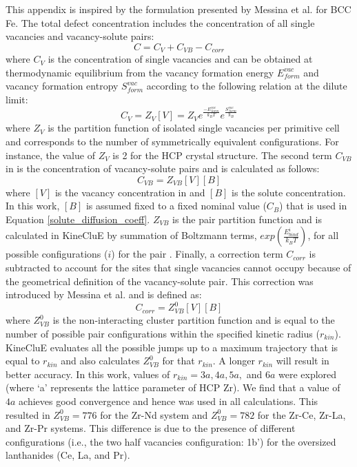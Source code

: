 \documentclass[preprint,12pt]{elsarticle}
\begin{document}
This appendix is inspired by the formulation presented by Messina et al. \cite{messina_solute_2020} for BCC Fe. The total defect concentration includes the concentration of all single vacancies and vacancy-solute pairs:
\begin{equation}
\label{eq_tot_conc}
    C = C_V + C_{VB} - C_{corr}
\end{equation}
where $C_V$ is the concentration of single vacancies and can be obtained at thermodynamic equilibrium from the vacancy formation energy $E_{form}^{vac}$ and vacancy formation entropy $S_{form}^{vac}$ according to the following relation at the dilute limit:
\begin{equation}
\label{eq_vac_conc}
    C_V = Z_V [V] = Z_V e^{\frac{-E_{form}^{vac}}{k_B T}} e^{\frac{S_{form}^{vac}}{k_B}}
\end{equation}
where $Z_V$ is the partition function of isolated single vacancies per primitive cell and corresponds to the number of symmetrically equivalent configurations. For instance, the value of $Z_V$ is 2 for the HCP crystal structure. The second term $C_{VB}$ in  is the concentration of vacancy-solute pairs and is calculated as follows:
\begin{equation}
    C_{VB} = Z_{VB} [V] [B]
\end{equation}
where $[V]$ is the vacancy concentration in  and $[B]$ is the solute concentration. In this work, $[B]$ is assumed fixed to a fixed nominal value ($C_B$) that is used in Equation \ref{solute_diffusion_coeff}. $Z_{VB}$ is the pair partition function and is calculated in KineCluE by summation of Boltzmann terms, $exp(\frac{E_{bind}^i}{k_B T})$, for all possible configurations ($i$) for the pair \cite{schuler_kineclue_2020}. Finally, a correction term $C_{corr}$ is subtracted to account for the sites that single vacancies cannot occupy because of the geometrical definition of the vacancy-solute pair. This correction was introduced by Messina et al. \cite{messina_solute_2020} and is defined as:
\begin{equation}
\label{eq_corr_conc}
    C_{corr} = Z_{VB}^0 [V] [B]
\end{equation}
where $Z_{VB}^0$ is the non-interacting cluster partition function and is equal to the number of possible pair configurations within the specified kinetic radius ($r_{kin}$). KineCluE evaluates all the possible jumps up to a maximum trajectory that is equal to $r_{kin}$ and also calculates $Z_{VB}^0$ for that $r_{kin}$. A longer $r_{kin}$ will result in better accuracy. In this work, values of $r_{kin} = 3a, 4a, 5a,$ and $6a$ were explored (where `a' represents the lattice parameter of HCP Zr). We find that a value of $4a$ achieves good convergence and hence was used in all calculations. This resulted in $Z_{VB}^0 = 776$ for the Zr-Nd system and $Z_{VB}^0 = 782$ for the Zr-Ce, Zr-La, and Zr-Pr systems. This difference is due to the presence of different configurations (i.e., the two half vacancies configuration: 1b') for the oversized lanthanides (Ce, La, and Pr). 
\end{document}
